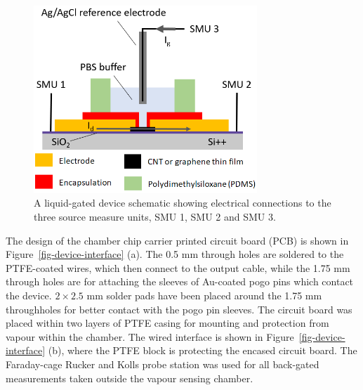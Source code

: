 \documentclass[
  a4paper,
]{scrbook}
\begin{document}
\begin{figure}

{\centering \includegraphics[width=0.75\textwidth,height=\textheight]{figures/ch4/liquid-gate-schematic.png}

}

\caption[A liquid-gated device schematic showing electrical connections
to the three source measure units, SMU 1, SMU 2 and SMU
3.]{\label{fig-liquid-gate}A liquid-gated device schematic showing
electrical connections to the three source measure units, SMU 1, SMU 2
and SMU 3.}

\end{figure}

The design of the chamber chip carrier printed circuit board (PCB) is
shown in Figure~\ref{fig-device-interface} (a). The 0.5 mm through holes
are soldered to the PTFE-coated wires, which then connect to the output
cable, while the 1.75 mm through holes are for attaching the sleeves of
Au-coated pogo pins which contact the device. \(2 \times 2.5\) mm solder
pads have been placed around the 1.75 mm throughholes for better contact
with the pogo pin sleeves. The circuit board was placed within two
layers of PTFE casing for mounting and protection from vapour within the
chamber. The wired interface is shown in
Figure~\ref{fig-device-interface} (b), where the PTFE block is
protecting the encased circuit board. The Faraday-cage Rucker and Kolls
probe station was used for all back-gated measurements taken outside the
vapour sensing chamber.
\end{document}
